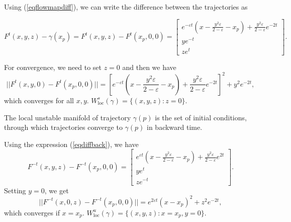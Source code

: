 \documentclass[a4paper,11pt,pdftex]{article}
\begin{document}
Using (\ref{eqflowmapdiff}), we can write the difference between the trajectories as

$$
F^t(x,y,z) - \gamma(x_p)= F^t(x,y,z) - F^t(x_p, 0, 0) = \begin{bmatrix}
e^{-\varepsilon t} \left(x - \frac{y^2 \varepsilon }{2-\varepsilon} - x_p \right) + \frac{y^2 \varepsilon }{2-\varepsilon}e^{-2t}\\
y e^{-t} \\
z e^{t}
\end{bmatrix}.
$$

For convergence, we need to set $z=0$ and then we have
$$
||F^t(x,y,0) - F^t(x_p, 0, 0)|| =\left[ e^{-\varepsilon t} \left(x - \frac{y^2 \varepsilon }{2-\varepsilon} - x_p \right) + \frac{y^2 \varepsilon }{2-\varepsilon}e^{-2t} \right]^2 + y^2e^{-2t},
$$
which converges for all $x,y$. $W^s_\text{loc}(\gamma) = \{ (x,y,z): z=0\}$. 


The local unstable manifold of trajectory $\gamma(p)$ is the set of initial conditions, through which trajectories converge to $\gamma(p)$ in backward time.

Using the expression (\ref{eqdiffback}), we have
$$
F^{-t}(x,y,z) - F^{-t}(x_p, 0, 0) = \begin{bmatrix}
e^{\varepsilon t} \left(x - \frac{y^2 \varepsilon }{2-\varepsilon} - x_p \right) + \frac{y^2 \varepsilon }{2-\varepsilon}e^{2t}\\
y e^{t} \\
z e^{-t}
\end{bmatrix}.
$$
Setting $y=0$, we get
$$
||F^{-t}(x,0,z) - F^{-t}(x_p, 0, 0)|| = e^{2\varepsilon t} \left(x - x_p \right)^2 + z^2e^{-2t},
$$
which converges if $x=x_p$. $W^u_\text{loc}(\gamma) = \{ (x,y,z): x=x_p, y=0\}$. 
\end{document}

